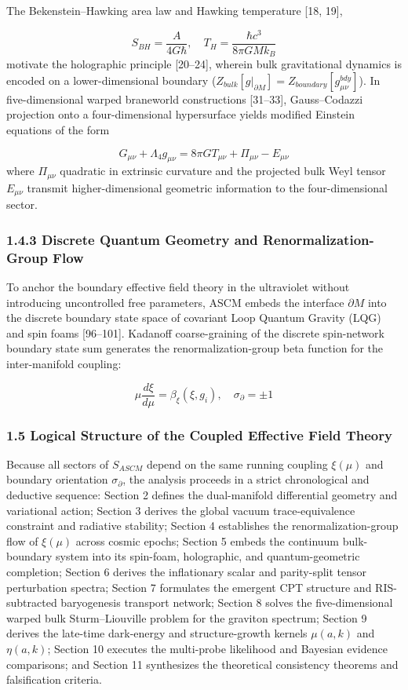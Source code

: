 \documentclass[aps,prd,onecolumn,superscriptaddress,nofootinbib,longbibliography,10pt]{revtex4-2}
\begin{document}
  The Bekenstein–Hawking area law and Hawking temperature [18, 19],


  \[ S_{BH} = \frac{A}{4G\hbar}, \quad T_H = \frac{\hbar c^3}{8\pi G M k_B} \]
  motivate the holographic principle [20–24], wherein bulk gravitational dynamics is encoded on a lower-dimensional boundary (\(Z_{bulk}[g|_{\partial M}] = Z_{boundary}[g_{\mu\nu}^{bdy}]\)). In five-dimensional warped braneworld constructions [31–33], Gauss–Codazzi projection onto a four-dimensional hypersurface yields modified Einstein equations of the form


  \[ G_{\mu\nu} + \Lambda_4 g_{\mu\nu} = 8\pi G T_{\mu\nu} + \Pi_{\mu\nu} - E_{\mu\nu} \]
  where \(\Pi_{\mu\nu}\) quadratic in extrinsic curvature and the projected bulk Weyl tensor \(E_{\mu\nu}\) transmit higher-dimensional geometric information to the four-dimensional sector.


  
\subsubsection*{1.4.3 Discrete Quantum Geometry and Renormalization-Group Flow}

  To anchor the boundary effective field theory in the ultraviolet without introducing uncontrolled free parameters, ASCM embeds the interface \(\partial M\) into the discrete boundary state space of covariant Loop Quantum Gravity (LQG) and spin foams [96–101]. Kadanoff coarse-graining of the discrete spin-network boundary state sum generates the renormalization-group beta function for the inter-manifold coupling:


  \[ \mu \frac{d\xi}{d\mu} = \beta_\xi(\xi, g_i), \quad \sigma_\partial = \pm 1 \]

  
\subsubsection*{1.5 Logical Structure of the Coupled Effective Field Theory}

  Because all sectors of \(S_{ASCM}\) depend on the same running coupling \(\xi(\mu)\) and boundary orientation \(\sigma_\partial\), the analysis proceeds in a strict chronological and deductive sequence: Section 2 defines the dual-manifold differential geometry and variational action; Section 3 derives the global vacuum trace-equivalence constraint and radiative stability; Section 4 establishes the renormalization-group flow of \(\xi(\mu)\) across cosmic epochs; Section 5 embeds the continuum bulk-boundary system into its spin-foam, holographic, and quantum-geometric completion; Section 6 derives the inflationary scalar and parity-split tensor perturbation spectra; Section 7 formulates the emergent CPT structure and RIS-subtracted baryogenesis transport network; Section 8 solves the five-dimensional warped bulk Sturm--Liouville problem for the graviton spectrum; Section 9 derives the late-time dark-energy and structure-growth kernels \(\mu(a,k)\) and \(\eta(a,k)\); Section 10 executes the multi-probe likelihood and Bayesian evidence comparisons; and Section 11 synthesizes the theoretical consistency theorems and falsification criteria.
\end{document}
